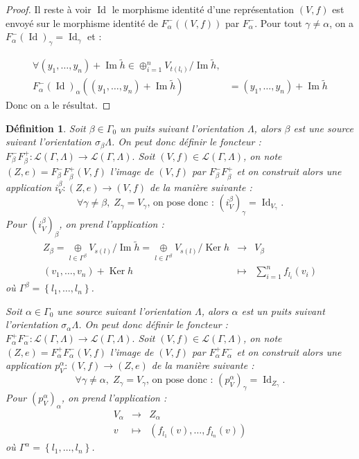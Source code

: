 \documentclass[a4paper,11pt]{article}
\newtheorem{defi}[thm]{Définition}%
\DeclareMathOperator{\Ker}{Ker}
\DeclareMathOperator{\Id}{Id}
\DeclareMathOperator{\Img}{Im}
\begin{document}
\begin{proof}
 Il reste à voir $\Id$ le morphisme identité d'une représentation $(V,f)$ est envoyé sur le morphisme identité de $F^{-}_{\alpha}((V,f))$ par $F^{-}_{\alpha}$. Pour tout $\gamma \neq \alpha$, on a $F^{-}_{\alpha}(\Id)_{\gamma} =\Id_{\gamma}$ et : 

\[
\begin{array}{rl}
  \forall (y_{1}, \dots, y_{n}) + \Img \widetilde{h} \in \oplus_{i=1}^{n} V_{t(l_{i})} / \Img \widetilde{h},& \\
F^{-}_{\alpha}(\Id)_{\alpha}((y_{1}, \dots, y_{n}) + \Img \widetilde{h}) &= (y_{1}, \dots, y_{n}) + \Img \widetilde{h}
\end{array}
\]
Donc on a le résultat.
\end{proof}

\begin{defi}
	Soit $\beta\in\Gamma_{0}$ un puits suivant l'orientation $\Lambda$, alors $\beta$ est une source suivant l'orientation $\sigma_{\beta}\Lambda$. On peut donc définir le foncteur : $F_{\beta}^{-}F_{\beta}^{+}:\mathscr{L}(\Gamma,\Lambda)\rightarrow\mathscr{L}(\Gamma,\Lambda).$ Soit $(V,f)\in\mathscr{L}(\Gamma,\Lambda)$, on note $(Z,e)=F_{\beta}^{-}F_{\beta}^{+}(V,f)$ l'image de $(V,f)$ par $F_{\beta}^{-}F_{\beta}^{+}$ et on construit alors une application $i_{V}^{\beta}:(Z,e)\rightarrow (V,f)$ de la manière suivante :
	\[
		\forall \gamma\neq\beta,\;Z_{\gamma}=V_{\gamma}\text{, on pose donc : }(i_{V}^{\beta})_{\gamma}=\Id_{V_{\gamma}}.
	\]
	Pour $(i_{V}^{\beta})_{\beta}$, on prend l'application : 
	\[
	\begin{array}{ccc}
		Z_{\beta}=\underset{l\in\Gamma^{\beta}}{\oplus} V_{s(l)}/\Img \widetilde{h}=\underset{l\in\Gamma^{\beta}}{\oplus} V_{s(l)}/\Ker h & \rightarrow & V_{\beta} \\
		(v_{1},\dots,v_{n})+\Ker h & \mapsto & \sum_{i=1}^{n}f_{l_{i}}(v_{i})
	\end{array}
	\]
	où $\Gamma^{\beta}=\left\{ l_{1},\dots,l_{n} \right\}$.

        Soit $\alpha\in\Gamma_{0}$ une source suivant l'orientation $\Lambda$, alors $\alpha$ est un puits suivant l'orientation $\sigma_{\alpha}\Lambda$. On peut donc définir le foncteur : $F_{\alpha}^{+}F_{\alpha}^{-}:\mathscr{L}(\Gamma,\Lambda)\rightarrow\mathscr{L}(\Gamma,\Lambda).$ Soit $(V,f)\in\mathscr{L}(\Gamma,\Lambda)$, on note $(Z,e)=F_{\alpha}^{+}F_{\alpha}^{-}(V,f)$ l'image de $(V,f)$ par $F_{\alpha}^{+}F_{\alpha}^{-}$ et on construit alors une application $p_{V}^{\alpha}:  (V,f)\rightarrow (Z,e)$ de la manière suivante :
	\[
		\forall \gamma\neq\alpha,\;Z_{\gamma}=V_{\gamma}\text{, on pose donc : }(p_{V}^{\alpha})_{\gamma}=\Id_{Z_{\gamma}}.
	\]
	Pour $(p_{V}^{\alpha})_{\alpha}$, on prend l'application : 
	\[
	\begin{array}{ccc}
		 V_{\alpha} & \rightarrow & Z_{\alpha} \\
		v & \mapsto & (f_{l_{1}}(v), \dots, f_{l_{n}}(v))
	\end{array}
	\]
	où $\Gamma^{\alpha}=\left\{ l_{1},\dots,l_{n} \right\}$.
\end{defi}
\end{document}
